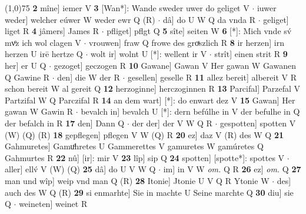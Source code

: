 \documentclass[8pt,a4paper,notitlepage]{article}
\begin{document}
\begin{table}[ht]
\begin{minipage}[t]{0.5\linewidth}
\line(1,0){75} \newline
\textbf{2} mîne] iemer V \textbf{3} [Wan*]: Wande sweder uwer do geliget V  $\cdot$ iuwer weder] welcher eúwer W weder ewr Q (R)  $\cdot$ dâ] do U W Q da vnda R  $\cdot$ geliget] liget R \textbf{4} jâmers] James R  $\cdot$ pfliget] pflgt Q \textbf{5} sîte] seiten W \textbf{6} [*]: Mich vnde sv́ mvͦz ich wol clagen V  $\cdot$ vrouwen] fraw Q frowe des groͯszlich R \textbf{8} ir herzen] irn herzen U irē hertze Q  $\cdot$ wolt ir] wolnt U [*]: wellent ir V  $\cdot$ strît] einen strit R \textbf{9} her] er U Q  $\cdot$ gezoget] geczogen R \textbf{10} Gawane] Gawan V Her gawan W Gawanen Q Gawine R  $\cdot$ den] die W der R  $\cdot$ gesellen] geselle R \textbf{11} allez bereit] albereit V R schon bereit W al gereit Q \textbf{12} herzoginne] herczoginnen R \textbf{13} Parcifal] Parzefal V Partzifal W Q Parczifal R \textbf{14} an dem wart] [*]: do enwart dez V \textbf{15} Gawan] Her gawan W Gawin R  $\cdot$ bevalch in] bevalch U [*]: dern befúlhe in V der befulhe in Q der befalch in R \textbf{17} den] Dann Q  $\cdot$ der der] der V W Q R  $\cdot$ gespotten] spotten V (W) (Q) (R) \textbf{18} gepflegen] pflegen V W (Q) R \textbf{20} ez] daz V (R) des W Q \textbf{21} Gahmuretes] Gamuͦhretes U Gammerettes V gamuretes W gamúretes Q Gahmurtes R \textbf{22} nû] [ir]: mir V \textbf{23} lîp] sip Q \textbf{24} spotten] [spotte*]: spottes V  $\cdot$ aller] ellv́ V (W) (Q) \textbf{25} dâ] do U V W Q  $\cdot$ im] in V W \textit{om.} Q R \textbf{26} ez] \textit{om.} Q \textbf{27} man und wîp] weip vnd man Q (R) \textbf{28} Itonie] Jtonie U V Q R Ytonie W  $\cdot$ des] auch des W Q (R) \textbf{29} si enmarhte] Sie in machte U Seine marchte Q \textbf{30} diu] sie Q  $\cdot$ weineten] weinet R \newline
\end{minipage}
\end{table}
\end{document}
